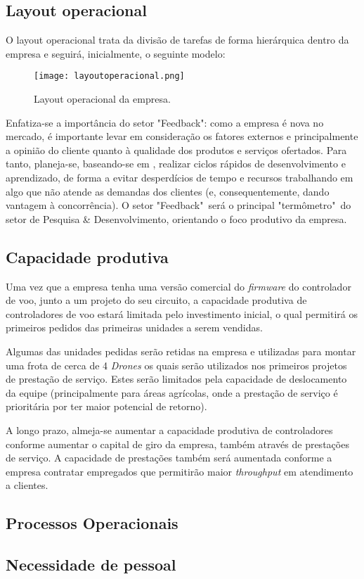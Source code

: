 \subsection{Layout operacional}

O layout operacional trata da divisão de tarefas de forma 
hierárquica dentro da empresa e seguirá, inicialmente, o seguinte
modelo:

\begin{figure}[H]
\centering
\texttt{[image: layoutoperacional.png]}
\caption{Layout operacional da empresa.}
\label{fig:layoutoperacional}
\end{figure}

Enfatiza-se a importância do setor "Feedback": como a empresa
é nova no mercado, é importante levar em consideração os 
fatores externos e principalmente a opinião do cliente quanto 
à qualidade dos produtos e serviços ofertados. Para tanto,
planeja-se, baseando-se em \cite{leanstartup}, realizar 
ciclos rápidos de desenvolvimento e aprendizado, de forma
a evitar desperdícios de tempo e recursos trabalhando em algo
que não atende as demandas dos clientes (e, consequentemente,
dando vantagem à concorrência). O setor "Feedback"\ será
o principal "termômetro"\ do setor de Pesquisa \& 
Desenvolvimento, orientando o foco produtivo da empresa.

\subsection{Capacidade produtiva}

Uma vez que a empresa tenha uma versão comercial do \emph{
firmware} do controlador de voo, junto a um projeto do seu
circuito, a capacidade produtiva de controladores de voo 
estará limitada pelo investimento inicial, o qual permitirá
os primeiros pedidos das primeiras unidades a serem vendidas.

Algumas das unidades pedidas serão retidas na empresa e 
utilizadas para montar uma frota de cerca de 4 \emph{Drones}
os quais serão utilizados nos primeiros projetos de prestação
de serviço. Estes serão limitados pela capacidade de
deslocamento da equipe (principalmente para áreas agrícolas,
onde a prestação de serviço é prioritária por ter maior
potencial de retorno).

A longo prazo, almeja-se aumentar a capacidade produtiva de
controladores conforme aumentar o capital de giro da empresa,
também através de prestações de serviço. A capacidade de 
prestações também será aumentada conforme a empresa contratar
empregados que permitirão maior \emph{throughput} em 
atendimento a clientes.

\subsection{Processos Operacionais}



\subsection{Necessidade de pessoal}


